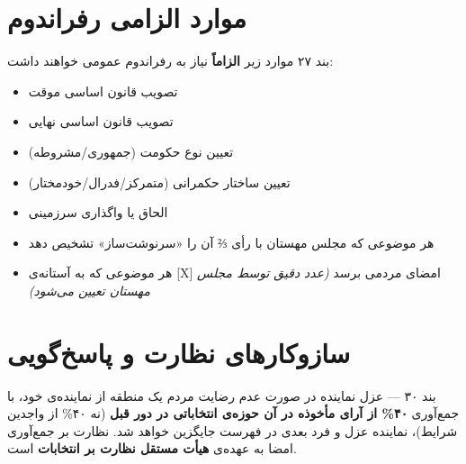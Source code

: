 \documentclass[12pt,a4paper,twoside,openany]{book}
\begin{document}
\begin{center}
{
		}%
	\end{center}
	\vspace{0.5\baselineskip}
	
	\section{موارد الزامی رفراندوم}
	
	\begin{bandbox}{بند ۲۷}
		موارد زیر \textbf{الزاماً} نیاز به رفراندوم عمومی خواهند داشت:
		\begin{itemize}
			\item تصویب قانون اساسی موقت
			\item تصویب قانون اساسی نهایی
			\item تعیین نوع حکومت (جمهوری/مشروطه)
			\item تعیین ساختار حکمرانی (متمرکز/فدرال/خودمختار)
			\item الحاق یا واگذاری سرزمینی
			\item هر موضوعی که مجلس مهستان با رأی ⅔ آن را «سرنوشت‌ساز» تشخیص دهد
			\item هر موضوعی که به آستانه‌ی [X] امضای مردمی برسد
			\textit{(عدد دقیق توسط مجلس مهستان تعیین می‌شود)}
		\end{itemize}
	\end{bandbox}
	
	\section{سازوکارهای نظارت و پاسخ‌گویی}
	
	\begin{bandbox}{بند ۳۰ --- عزل نماینده}
		در صورت عدم رضایت مردم یک منطقه از نماینده‌ی خود، با جمع‌آوری \textbf{۴۰\% از
			آرای مأخوذه در آن حوزه‌ی انتخاباتی در دور قبل} (نه ۴۰\% از واجدین شرایط)،
		نماینده عزل و فرد بعدی در فهرست جایگزین خواهد شد. نظارت بر جمع‌آوری امضا به
		عهده‌ی \textbf{هیأت مستقل نظارت بر انتخابات} است.
	\end{bandbox}
	
\end{document}
